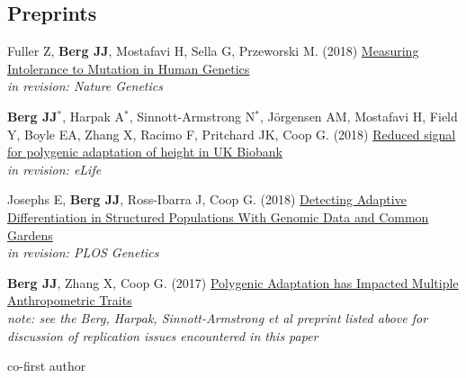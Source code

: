 \documentclass[letterpaper]{article}
\renewenvironment{itemize}{
  \begin{list}{}{
    \setlength{\leftmargin}{1.5em}
  }
}{
  \end{list}
}
\begin{document}
\subsection*{Preprints}
\begin{itemize}
%
%
%
  
\item Fuller Z, \textbf{Berg JJ}, Mostafavi H, Sella G, Przeworski M. (2018) \href{https://www.biorxiv.org/content/early/2018/08/01/382481}{Measuring Intolerance to Mutation in Human Genetics}\\
  \textit{in revision: Nature Genetics}
\item \textbf{Berg JJ}$^*$, Harpak A$^*$, Sinnott-Armstrong N$^*$, J{\"o}rgensen AM, Mostafavi H, Field Y, Boyle EA, Zhang X, Racimo F, Pritchard JK, Coop G. (2018) \href{https://www.biorxiv.org/content/early/2018/06/27/354951}{Reduced signal for polygenic adaptation of height in UK Biobank}\\
  \textit{in revision: eLife}
\item Josephs E, \textbf{Berg JJ}, Ross-Ibarra J, Coop G. (2018) \href{https://www.biorxiv.org/content/early/2018/07/13/368506}{Detecting Adaptive Differentiation in Structured Populations With Genomic Data and Common Gardens}\\
\textit{in revision: PLOS Genetics}
\item \textbf{Berg JJ}, Zhang X, Coop G. (2017) \href{https://doi.org/10.1101/167551}{Polygenic Adaptation has Impacted Multiple Anthropometric Traits}\\
  \textit{note: see the Berg, Harpak, Sinnott-Armstrong et al preprint listed above for discussion of replication issues encountered in this paper}
\item* co-first author


\end{itemize}
\end{document}
